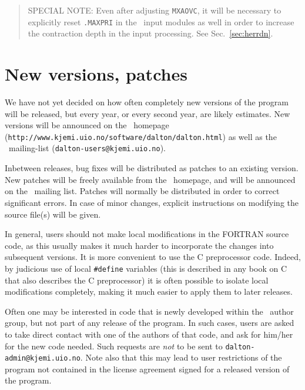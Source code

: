 \begin{quote}
SPECIAL NOTE: Even after adjusting \verb|MXAOVC|, it will be
necessary to explicitly reset \verb|.MAXPRI| in the
\her\ input modules as well in order to increase the contraction depth
in the input processing.  See Sec.~\ref{sec:herrdn}.
\end{quote}

\section{New versions, patches}

We have not yet decided on how often completely new versions of the
program will be released, but every year, or every second year, are
likely estimates. New versions will be announced on the \siraba\
homepage (\verb|http://www.kjemi.uio.no/software/dalton/dalton.html|) as well
as the \siraba\ mailing-list
(\verb|dalton-users@kjemi.uio.no|).

Inbetween releases, bug fixes will be distributed as
patches to an
existing version. New patches will be freely available from the
\siraba\ homepage, and will be announced on the \siraba\ mailing
list. Patches will normally be distributed in order to correct
significant errors. In case of minor changes, explicit
instructions on modifying the source file(s) will be given.

In general, users should not make local
modifications in the FORTRAN source code, as this usually makes it
much harder to incorporate the changes into subsequent versions.
It is more convenient to use the C preprocessor code.  Indeed, by
judicious use of local \verb|#define|\index{define} variables (this
is described in any book on C that also describes the C
preprocessor) it is often possible to isolate local
modifications completely, making it much easier
to apply them to later
releases.

Often one may be interested in code that is newly developed\index{new
code} within the
\siraba\ author group, but not part of any release of the program. In
such cases, users are asked to take direct contact with one of the
authors of that code, and ask for him/her for the new code
needed. Such requests are {\em not} to be sent to
\verb|dalton-admin@kjemi.uio.no|. Note also that this may lead to user
restrictions of the program not contained in the license agreement
signed for a released version of the program.

